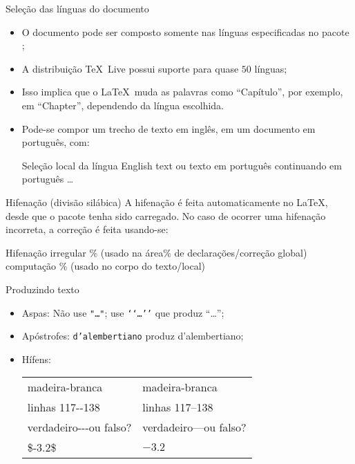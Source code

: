 \begin{frame}{Seleção das línguas do documento}
	\begin{itemize}
		\item O documento pode ser composto somente nas línguas especificadas no pacote ; 
		\pause
		\item A distribuição \TeX\ Live possui suporte para quase $50$ línguas;
		\pause
		\item Isso implica que o \LaTeX\ muda as palavras como ``Capítulo'', por exemplo, em ``Chapter'', dependendo da língua escolhida.
		\pause
		\item Pode-se compor um trecho de texto em inglês, em um documento em português, com:
		\pause
			\begin{Codigo}{Seleção local da língua}
				\n
				English text\n
				\n
				ou\n
				texto em português 
				continuando em português \dots
			\end{Codigo}
	\end{itemize}
\end{frame}

\begin{frame}{Hifenação (divisão silábica)}
	A hifenação é feita automaticamente no \LaTeX, desde que o pacote  tenha sido carregado. No caso de ocorrer uma hifenação incorreta, a correção é feita usando-se:
	\pause
	\begin{Codigo}{Hifenação irregular}
		 \% (usado na área\n \% de declarações/correção global)\nn
		com\LCmd{-}pu\LCmd{-}ta\LCmd{-}ção \% (usado no corpo do texto/local)
	\end{Codigo}
\end{frame}

\begin{frame}{Produzindo texto}
	\begin{itemize}
		\item Aspas: Não use \texttt{\string"\dots\string"}; use \texttt{`{}`\dots'{}'} que produz ``\dots'';
		\pause
		\item Apóstrofes: \texttt{d'alembertiano} produz d'alembertiano;
		\pause
		\item Hífens:
			\begin{center}\let\tt\ttfamily
				\begin{tabular}{ll}
					\tt madeira-branca & madeira-branca \\
					\pause					
					\tt linhas 117-{}-138 & linhas 117--138 \\
					\pause
					\tt verdadeiro-{}-{}-ou falso? & verdadeiro---ou falso? \\
					\pause
					\tt \$-3.2\$ & $-3.2$
				\end{tabular}
			\end{center}
	\end{itemize}
\end{frame}

